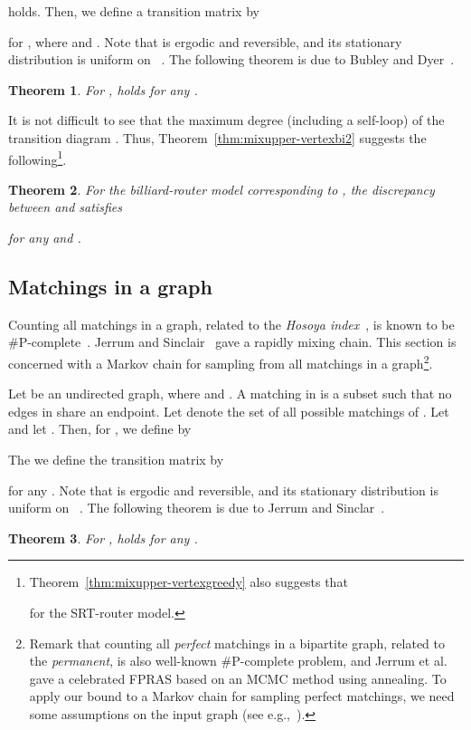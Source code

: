 \documentclass[letter, 11pt]{article}
\newcommand{\1}{\mbox{1}\hspace{-0.25em}\mbox{l}}
\newtheorem{theorem}{Theorem}[section]
\begin{document}
holds. Then, we define a transition matrix  by

for , where  and . 
Note that  is ergodic and reversible, and 
 its stationary distribution is uniform on ~\cite{BD99}. 
The following theorem is due to Bubley and Dyer~\cite{BD99}. 
\begin{theorem}
\label{thm:linearmix}
\cite{BD99}
For , 
holds for any . 
\end{theorem}

 It is not difficult to see that the maximum degree  (including a self-loop) 
   of the transition diagram . 
 Thus, Theorem~\ref{thm:mixupper-vertexbi2} suggests the following\footnote{
   Theorem~\ref{thm:mixupper-vertexgreedy} also suggests that 
 
for the SRT-router model. 
  }. 
\begin{theorem}\label{thm:linearupper-SRT}
For the billiard-router model corresponding to , 
 the discrepancy between  and  satisfies

for any  and . 
\end{theorem}

\subsection{Matchings in a graph}\label{sec:matching}Counting all matchings in a graph, 
   related to the {\em Hosoya index}~\cite{Hosoya71}, 
  is known to be {\#}P-complete~\cite{Valiant79b}. 
 Jerrum and Sinclair~\cite{JS96} gave a rapidly mixing chain. 
 This section is concerned with a Markov chain for sampling from all matchings in a graph\footnote{ 
Remark that 
  counting all {\em perfect} matchings in a bipartite graph, 
   related to the {\em permanent}, 
  is also well-known {\#}P-complete problem, 
  and  
   Jerrum et al.~\cite{JSV04} gave a celebrated FPRAS 
   based on an MCMC method using annealing.
 To apply our bound to a Markov chain for sampling perfect matchings, 
  we need some assumptions on the input graph (see e.g.,~\cite{Sinclair93,JS96,JSV04}). 
}. 

Let  be an undirected graph, where  and . 
A matching in  is a subset  such that no edges in  share an endpoint. 
Let  denote the set of all possible matchings of . 
Let 
and let .
Then, for , we define  by 

The we define the transition matrix  by 

for any . 
Note that  is ergodic and reversible, and 
  its stationary distribution is uniform on ~\cite{JS96}. 
The following theorem is due to Jerrum and Sinclar~\cite{JS96}.  
\begin{theorem}
\cite{JS96}
\label{thm:matchmix}
For , 
holds for any . 
\end{theorem}
\end{document}
